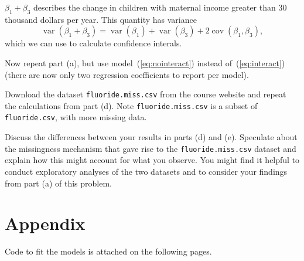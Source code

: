 \documentclass[11pt, letterpaper]{article}
\begin{document}
\begin{enumerate}[(a)]
\begin{description}
  $\beta_1 + \beta_3$ describes the change in children with maternal income
  greater than 30 thousand dollars per year. This quantity has variance
  \begin{equation}
    \operatorname{var}\left(\beta_1 + \beta_3\right)
    = \operatorname{var}\left(\beta_1\right) + \operatorname{var}\left(\beta_3\right) +
    2\operatorname{cov}\left(\beta_1, \beta_3\right),
  \end{equation}
  which we can use to calculate confidence interals.
\end{description}
{\em \item Now repeat part (a), but use model~(\ref{eq:nointeract}) instead of~(\ref{eq:interact}) (there are now only two regression coefficients to report per model).}
{\em \item Download the dataset \texttt{fluoride.miss.csv} from the course website and repeat the calculations from part (d).  Note \texttt{fluoride.miss.csv} is a subset of \texttt{fluoride.csv}, with more missing data.}
{\em \item  Discuss the differences between your results in parts (d) and (e).  Speculate
about the missingness mechanism that gave rise to the \texttt{fluoride.miss.csv} dataset and 
explain how this might account for what you observe.  You might find it
helpful to conduct exploratory analyses of the two datasets and to consider your findings from part (a) of
this problem.
}

\end{enumerate}


\FloatBarrier

\section*{Appendix}

Code to fit the models is attached on the following pages.


\end{document}
